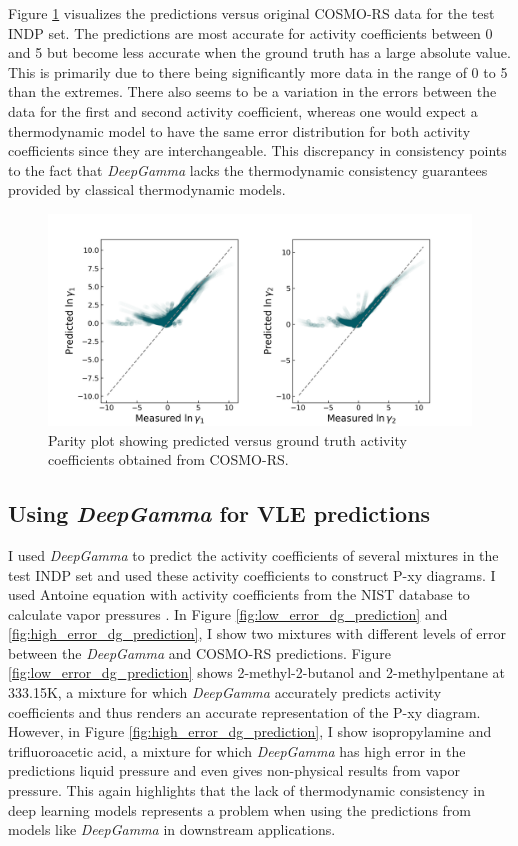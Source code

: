Figure \ref{fig:dg_test_indp_parity_plot} visualizes the predictions versus original COSMO-RS data for the test INDP set. The predictions are most accurate for activity coefficients between 0 and 5 but become less accurate when the ground truth has a large absolute value. This is primarily due to there being significantly more data in the range of 0 to 5 than the extremes. There also seems to be a variation in the errors between the data for the first and second activity coefficient, whereas one would expect a thermodynamic model to have the same error distribution for both activity coefficients since they are interchangeable. This discrepancy in consistency points to the fact that \textit{DeepGamma} lacks the thermodynamic consistency guarantees provided by classical thermodynamic models.
 
\begin{figure}
    \centering
    \includegraphics[width=\textwidth]{gfx/Chapter07/DG_test_indp_parity_plot.png}
    \caption{Parity plot showing predicted versus ground truth activity coefficients obtained from COSMO-RS.}
    \label{fig:dg_test_indp_parity_plot}
\end{figure}

\subsection{Using \textit{DeepGamma} for VLE predictions}

I used \textit{DeepGamma} to predict the activity coefficients of several mixtures in the test INDP set and used these activity coefficients to construct P-xy diagrams. I used Antoine equation with activity coefficients from the NIST database to calculate vapor pressures \cite{Muzny}. In Figure \ref{fig:low_error_dg_prediction} and \ref{fig:high_error_dg_prediction}, I show two mixtures with different levels of error  between the \textit{DeepGamma} and COSMO-RS predictions. Figure \ref{fig:low_error_dg_prediction} shows 2-methyl-2-butanol and 2-methylpentane at 333.15K, a mixture for which \textit{DeepGamma} accurately predicts activity coefficients and thus renders an accurate representation of the P-xy diagram.  However, in Figure \ref{fig:high_error_dg_prediction}, I show isopropylamine and trifluoroacetic acid, a mixture for which \textit{DeepGamma} has high error in the predictions liquid pressure and even gives non-physical results from vapor pressure. This again highlights that the lack of thermodynamic consistency in deep learning models represents a problem when using the predictions from models like \textit{DeepGamma} in downstream applications.

